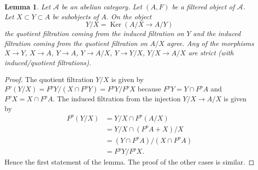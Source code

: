 \documentclass[10pt,a4paper]{amsart}
\theoremstyle{plain}
\newtheorem{lemma}[subsection]{Lemma}
\theoremstyle{definition}
\theoremstyle{remark}
\numberwithin{equation}{subsection}
\def\Ker{\mathop{\mathrm{Ker}}}
\begin{document}
\begin{lemma}
\label{lemma-filtration-subobject}
Let $\mathcal{A}$ be an abelian category.
Let $(A, F)$ be a filtered object of $\mathcal{A}$.
Let $X \subset Y \subset A$ be subobjects of $A$.
On the object
$$
Y/X = \Ker(A/X \to A/Y)
$$
the quotient filtration coming from the induced filtration on $Y$ and the
induced filtration coming from the quotient filtration on $A/X$ agree.
Any of the morphisms $X \to Y$, $X \to A$, $Y \to A$, $Y \to A/X$,
$Y \to Y/X$, $Y/X \to A/X$ are strict (with induced/quotient filtrations).
\end{lemma}

\begin{proof}
The quotient filtration $Y/X$ is given by
$F^p(Y/X) = F^pY/(X \cap F^pY) = F^pY/F^pX$
because $F^pY = Y \cap F^pA$ and $F^pX = X \cap F^pA$.
The induced filtration from the injection $Y/X \to A/X$ is given by
\begin{align*}
F^p(Y/X) & = Y/X \cap F^p(A/X) \\
& = Y/X \cap (F^pA + X)/X \\
& = (Y \cap F^pA)/(X \cap F^pA) \\
& = F^pY/F^pX.
\end{align*}
Hence the first statement of the lemma.
The proof of the other cases is similar.
\end{proof}
\end{document}
